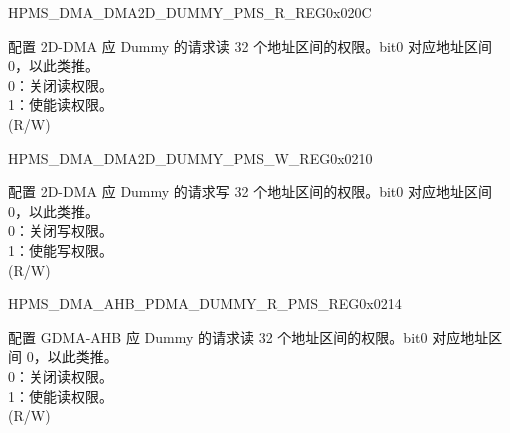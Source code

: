 \begin{register}{H}{PMS\_DMA\_DMA2D\_DUMMY\_PMS\_R\_REG}{0x020C}\label{regdesc:PMSDMADMA2DDUMMYPMSRREG}
%
\regnewline%
\begin{regdesc}\begin{reglist}
\label{fielddesc:PMSDMADMA2DDUMMYRPMS}\item [PMS\_DMA\_DMA2D\_DUMMY\_R\_PMS] 配置 2D-DMA 应 Dummy 的请求读 32 个地址区间的权限。bit0 对应地址区间 0，以此类推。\\
0：关闭读权限。\\
1：使能读权限。\\ (R/W)
\end{reglist}\end{regdesc}
\end{register}


\begin{register}{H}{PMS\_DMA\_DMA2D\_DUMMY\_PMS\_W\_REG}{0x0210}\label{regdesc:PMSDMADMA2DDUMMYPMSWREG}
%
\regnewline%
\begin{regdesc}\begin{reglist}
\label{fielddesc:PMSDMADMA2DDUMMYWPMS}\item [PMS\_DMA\_DMA2D\_DUMMY\_W\_PMS] 配置 2D-DMA 应 Dummy 的请求写 32 个地址区间的权限。bit0 对应地址区间 0，以此类推。\\
0：关闭写权限。\\
1：使能写权限。\\ (R/W)
\end{reglist}\end{regdesc}
\end{register}


\begin{register}{H}{PMS\_DMA\_AHB\_PDMA\_DUMMY\_R\_PMS\_REG}{0x0214}\label{regdesc:PMSDMAAHBPDMADUMMYRPMSREG}
%
\regnewline%
\begin{regdesc}\begin{reglist}
\label{fielddesc:PMSDMAAHBPDMADUMMYRPMS}\item [PMS\_DMA\_AHB\_PDMA\_DUMMY\_R\_PMS] 配置 GDMA-AHB 应 Dummy 的请求读 32 个地址区间的权限。bit0 对应地址区间 0，以此类推。\\
0：关闭读权限。\\
1：使能读权限。\\ (R/W)
\end{reglist}\end{regdesc}
\end{register}


